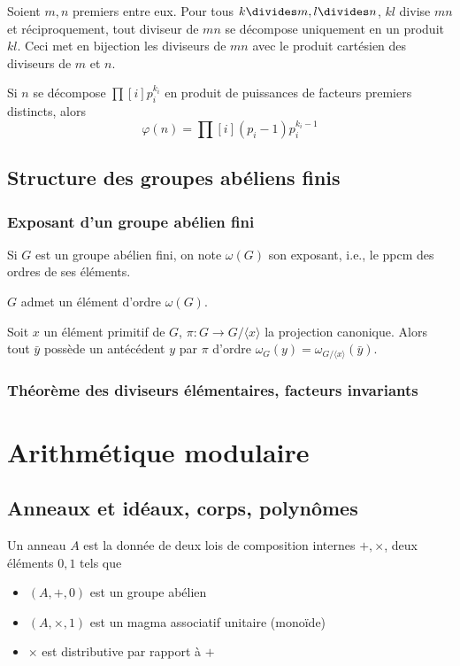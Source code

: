 \documentclass[a4paper,11pt,twocolumn]{article}\usepackage[landscape]{geometry}
\begin{document}
       Soient $m,n$ premiers entre eux. Pour tous $k\divides m, l\divides n$, $kl$ divise $mn$ et réciproquement, tout diviseur de $mn$ se décompose uniquement en un produit $kl$. Ceci met en bijection les diviseurs de $mn$ avec le produit cartésien des diviseurs de $m$ et $n$.

       Si $n$ se décompose $\prod[i]{p_i^{k_i}}$ en produit de puissances de facteurs premiers distincts, alors
      \[\varphi(n) = \prod[i]{(p_i-1)p_i^{k_i-1}}\]

  \subsection{Structure des groupes abéliens finis}

    \subsubsection{Exposant d'un groupe abélien fini}

       Si $G$ est un groupe abélien fini, on note $\omega(G)$ son exposant, i.e., le ppcm des ordres de ses éléments.

       $G$ admet un élément d'ordre $\omega(G)$.

       Soit $x$ un élément primitif de $G$, $π:G\rightarrow G/\langle x\rangle$ la projection canonique. Alors tout $\bar{y}$ possède un antécédent $y$ par $\pi$ d'ordre $\omega_G(y)=\omega_{G/\langle x\rangle}(\bar{y})$.

    \subsubsection{Théorème des diviseurs élémentaires, facteurs invariants}


\section{Arithmétique modulaire}

  \subsection{Anneaux et idéaux, corps, polynômes}

     Un anneau $A$ est la donnée de deux lois de composition internes $+,\times$, deux éléments $0,1$ tels que
    \begin{itemize}
      \item $(A,+,0)$ est un groupe abélien
      \item $(A,\times,1)$ est un magma associatif unitaire (monoïde)
      \item $\times$ est distributive par rapport à $+$
    \end{itemize}
\end{document}
